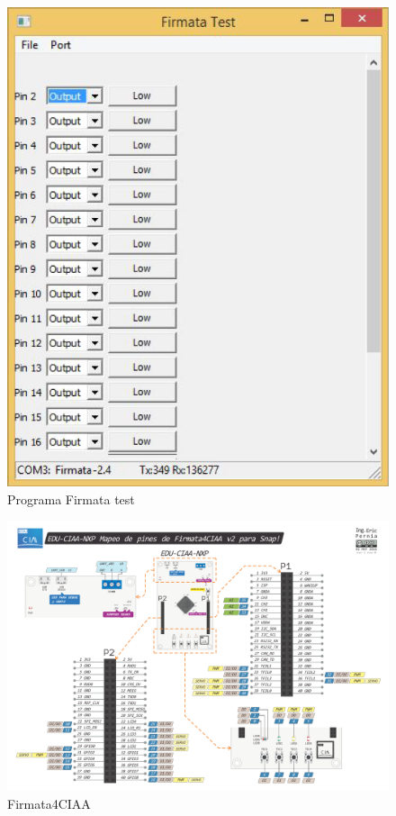 \begin{figure}[!htbp]
	\centering
	\includegraphics[width=12cm]{./Figures/firmataTest.png}
	\caption{Programa Firmata test}
	\label{fig:firmataTest}
\end{figure}

\begin{figure}[!htbp]
	\centering
	\includegraphics[width=15cm]{./Appendices/MapeoPinesFirmata4CIAAv2.pdf}
	\caption{Firmata4CIAA}
	\label{fig:MapeoPinesFirmata4CIAAv2}
\end{figure}

